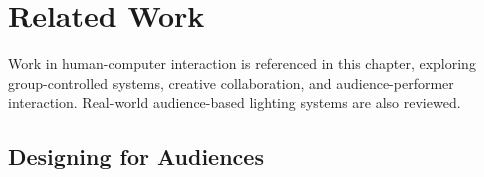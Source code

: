 

\section{Related Work}

Work in human-computer interaction is referenced in this chapter, exploring group-controlled systems, creative collaboration, and audience-performer interaction. Real-world audience-based lighting systems are also reviewed.

\subsection{Designing for Audiences}

